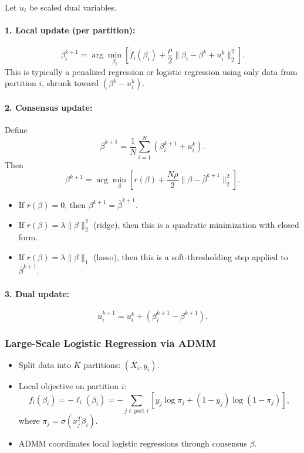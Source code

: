 \documentclass[11pt]{article}
\begin{document}
Let $u_i$ be scaled dual variables.

\paragraph{1. Local update (per partition):}
\[
    \beta_i^{k+1} = \arg\min_{\beta_i} \left[ f_i(\beta_i) + \frac{\rho}{2}\|\beta_i - \beta^k + u_i^k\|_2^2 \right].
\]
This is typically a penalized regression or logistic regression using only data from partition $i$, shrunk toward $(\beta^k - u_i^k)$.

\paragraph{2. Consensus update:}
Define
\[
    \bar{\beta}^{k+1} = \frac{1}{N} \sum_{i=1}^N \left(\beta_i^{k+1} + u_i^k\right).
\]
Then
\[
    \beta^{k+1} = \arg\min_\beta \left[ r(\beta) + \frac{N \rho}{2} \|\beta - \bar{\beta}^{k+1}\|_2^2 \right].
\]

\begin{itemize}
    \item If $r(\beta) = 0$, then $\beta^{k+1} = \bar{\beta}^{k+1}$.
    \item If $r(\beta) = \lambda \|\beta\|_2^2$ (ridge), then this is a quadratic minimization with closed form.
    \item If $r(\beta) = \lambda \|\beta\|_1$ (lasso), then this is a soft-thresholding step applied to $\bar{\beta}^{k+1}$.
\end{itemize}

\paragraph{3. Dual update:}
\[
    u_i^{k+1} = u_i^k + \left(\beta_i^{k+1} - \beta^{k+1}\right).
\]

\subsubsection*{Large-Scale Logistic Regression via ADMM}

\begin{itemize}
    \item Split data into $K$ partitions: $(X_i, y_i)$.
    \item Local objective on partition $i$:
    \[
        f_i(\beta_i) = -\ell_i(\beta_i) = -\sum_{j \in \text{part } i} \left[y_j \log \pi_j + (1-y_j)\log(1-\pi_j)\right],
    \]
    where $\pi_j = \sigma(x_j^T \beta_i)$.
    \item ADMM coordinates local logistic regressions through consensus $\beta$.
\end{itemize}
\end{document}

